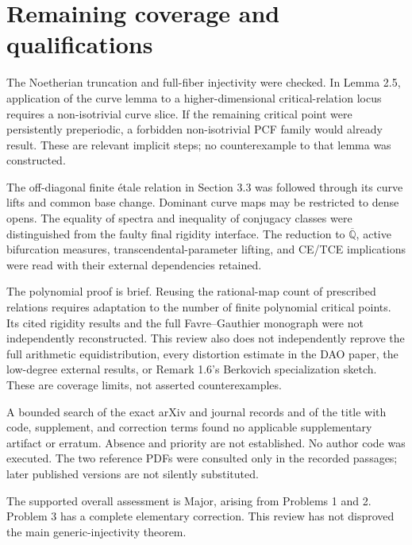 \documentclass[10pt]{article}
\begin{document}
\section*{Remaining coverage and qualifications}
The Noetherian truncation and full-fiber injectivity were checked. In Lemma 2.5, application of the curve lemma to a higher-dimensional critical-relation locus requires a non-isotrivial curve slice. If the remaining critical point were persistently preperiodic, a forbidden non-isotrivial PCF family would already result. These are relevant implicit steps; no counterexample to that lemma was constructed.\par
The off-diagonal finite étale relation in Section 3.3 was followed through its curve lifts and common base change. Dominant curve maps may be restricted to dense opens. The equality of spectra and inequality of conjugacy classes were distinguished from the faulty final rigidity interface. The reduction to \(\overline{\mathbb Q}\), active bifurcation measures, transcendental-parameter lifting, and CE/TCE implications were read with their external dependencies retained.\par
The polynomial proof is brief. Reusing the rational-map count of prescribed relations requires adaptation to the number of finite polynomial critical points. Its cited rigidity results and the full Favre–Gauthier monograph were not independently reconstructed. This review also does not independently reprove the full arithmetic equidistribution, every distortion estimate in the DAO paper, the low-degree external results, or Remark 1.6’s Berkovich specialization sketch. These are coverage limits, not asserted counterexamples.\par
A bounded search of the exact arXiv and journal records and of the title with code, supplement, and correction terms found no applicable supplementary artifact or erratum. Absence and priority are not established. No author code was executed. The two reference PDFs were consulted only in the recorded passages; later published versions are not silently substituted.\par
The supported overall assessment is Major, arising from Problems 1 and 2. Problem 3 has a complete elementary correction. This review has not disproved the main generic-injectivity theorem.\par
\end{document}
